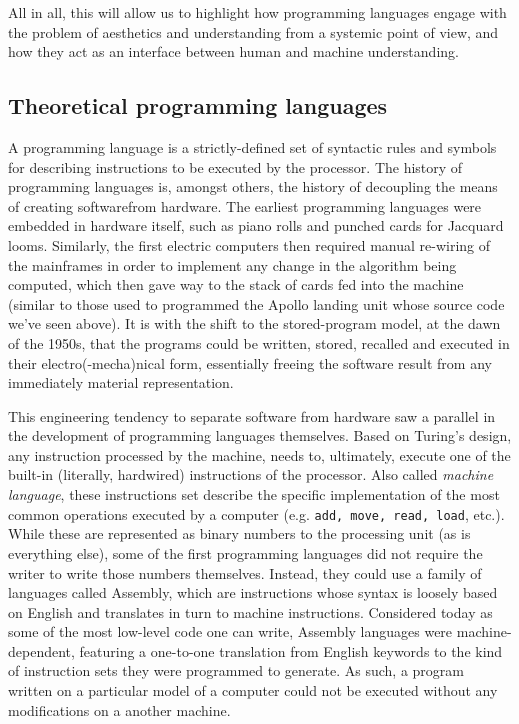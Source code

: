 \documentclass{article}
\begin{document}
All in all, this will allow us to highlight how programming languages engage with the problem of aesthetics and understanding from a systemic point of view, and how they act as an interface between human and machine understanding.

\vspace{1\baselineskip}

\subsection{Theoretical programming languages}

A programming language is a strictly-defined set of syntactic rules and symbols for describing instructions to be executed by the processor. The history of programming languages is, amongst others, the history of decoupling the means of creating softwarefrom hardware. The earliest programming languages were embedded in hardware itself, such as piano rolls and punched cards for Jacquard looms. Similarly, the first electric computers then required manual re-wiring of the mainframes in order to implement any change in the algorithm being computed, which then gave way to the stack of cards fed into the machine (similar to those used to programmed the Apollo landing unit whose source code we've seen above). It is with the shift to the stored-program model, at the dawn of the 1950s, that the programs could be written, stored, recalled and executed in their electro(-mecha)nical form, essentially freeing the software result from any immediately material representation.

This engineering tendency to separate software from hardware saw a parallel in the development of programming languages themselves. Based on Turing's design, any instruction processed by the machine, needs to, ultimately, execute one of the built-in (literally, hardwired) instructions of the processor. Also called \emph{machine language}, these instructions set describe the specific implementation of the most common operations executed by a computer (e.g. \lstinline{add, move, read, load}, etc.). While these are represented as binary numbers to the processing unit (as is everything else), some of the first programming languages did not require the writer to write those numbers themselves. Instead, they could use a family of languages called Assembly, which are instructions whose syntax is loosely based on English and translates in turn to machine instructions. Considered today as some of the most low-level code one can write, Assembly languages were machine-dependent, featuring a one-to-one translation from English keywords to the kind of instruction sets they were programmed to generate. As such, a program written on a particular model of a computer could not be executed without any modifications on a another machine.
\end{document}
